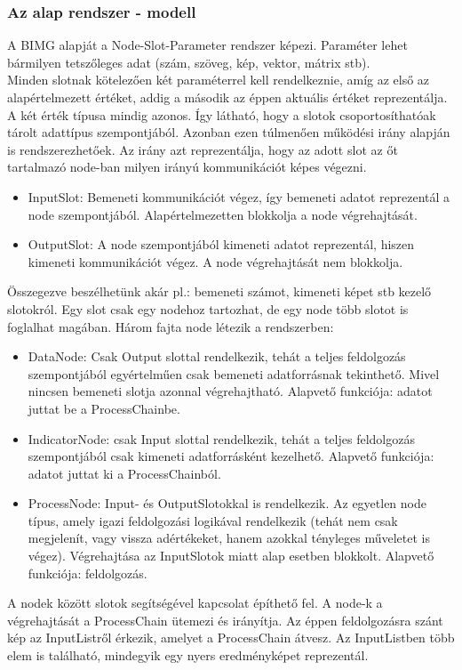 \documentclass[a4paper,12pt,oneside]{report}
\begin{document}
\subsubsection{Az alap rendszer - modell}
A BIMG alapját a Node-Slot-Parameter rendszer képezi. Paraméter lehet bármilyen tetszőleges adat (szám, szöveg, kép, vektor, mátrix stb).\\ Minden slotnak kötelezően két paraméterrel kell rendelkeznie, amíg az első az alapértelmezett értéket, addig a második az éppen aktuális értéket reprezentálja. A két érték típusa mindig azonos. Így látható, hogy a slotok csoportosíthatóak  tárolt adattípus szempontjából. Azonban ezen túlmenően működési irány alapján is rendszerezhetőek. Az irány azt reprezentálja, hogy az adott slot az őt tartalmazó node-ban milyen irányú kommunikációt képes végezni.
\begin{itemize}
	\itemsep0em
	\item InputSlot: Bemeneti kommunikációt végez, így bemeneti adatot reprezentál a node szempontjából. Alapértelmezetten blokkolja a node végrehajtását.
	\item OutputSlot: A node szempontjából kimeneti adatot reprezentál, hiszen kimeneti kommunikációt végez. A node végrehajtását nem blokkolja.
\end{itemize}
Összegezve beszélhetünk akár pl.: bemeneti számot, kimeneti képet stb kezelő slotokról. Egy slot csak egy nodehoz tartozhat, de egy node több slotot is foglalhat magában.
Három fajta node létezik a rendszerben:
\begin{itemize}
	\itemsep0em
	\item DataNode: Csak Output slottal rendelkezik, tehát a teljes feldolgozás szempontjából egyértelműen csak bemeneti adatforrásnak tekinthető. Mivel nincsen bemeneti slotja azonnal végrehajtható. Alapvető funkciója: adatot juttat be a ProcessChainbe.
	\item IndicatorNode: csak Input slottal rendelkezik, tehát a teljes feldolgozás szempontjából csak kimeneti adatforrásként kezelhető. Alapvető funkciója: adatot juttat ki a ProcessChainból.
	\item ProcessNode: Input- és OutputSlotokkal is rendelkezik. Az egyetlen node típus, amely igazi feldolgozási logikával rendelkezik (tehát nem csak megjelenít, vagy vissza adértékeket, hanem azokkal tényleges műveletet is végez). Végrehajtása az InputSlotok miatt alap esetben blokkolt. Alapvető funkciója: feldolgozás.

\end{itemize}
A nodek között slotok segítségével kapcsolat építhető fel. A node-k a végrehajtását a ProcessChain ütemezi és irányítja. Az éppen feldolgozásra szánt kép az InputListről érkezik, amelyet a ProcessChain átvesz. Az InputListben több elem is található, mindegyik egy nyers eredményképet reprezentál.\\
\end{document}
